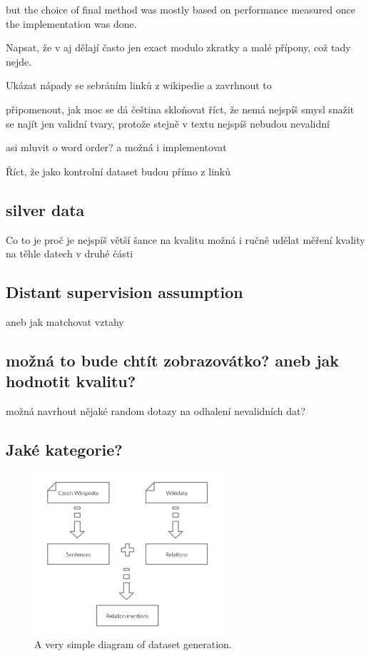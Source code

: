  but the choice of final method was mostly based on performance measured once the implementation was done. 



Napsat, že v aj dělají často jen exact modulo zkratky a malé přípony, což tady nejde.

Ukázat nápady se sebráním linků z wikipedie a zavrhnout to

připomenout, jak moc se dá čeština skloňovat
říct, že nemá nejspíš smysl snažit se najít jen validní tvary, protože stejně v textu nejspíš nebudou nevalidní

asi mluvit o word order? a možná i implementovat

Říct, že jako kontrolní dataset budou přímo z linků

\subsection{silver data}
Co to je
proč je nejspíš větší šance na kvalitu
možná i ručně udělat měření kvality na těhle datech v druhé části


\subsection{Distant supervision assumption}
aneb jak matchovat vztahy

\subsection{možná to bude chtít zobrazovátko? aneb jak hodnotit kvalitu?}
možná navrhout nějaké random dotazy na odhalení nevalidních dat?


\subsection{Jaké kategorie?}



\begin{figure}[h]
\begin{center}
\includegraphics[width=70mm, height=60mm]{./img/a_very_simple_diagram}
\caption{A very simple diagram of dataset generation.}
\label{obr02:AVerySimple}
\end{center}
\end{figure}


